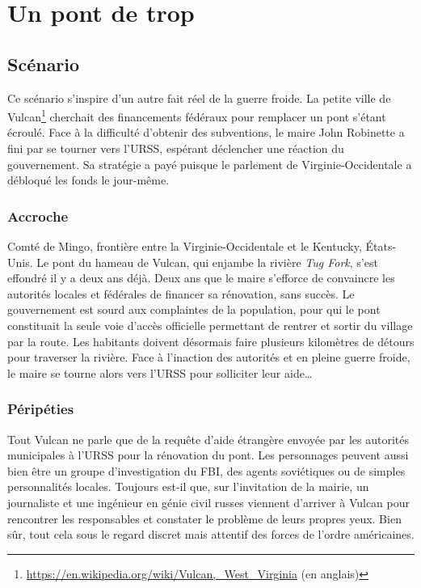 \chapter{Un pont de trop}

\section{Scénario}

Ce scénario s'inspire d'un autre fait réel de la guerre froide. La petite ville de Vulcan\footnote{\url{https://en.wikipedia.org/wiki/Vulcan,_West_Virginia} (en anglais)} cherchait des financements fédéraux pour remplacer un pont s'étant écroulé.
Face à la difficulté d'obtenir des subventions, le maire John Robinette a fini par se tourner vers l'URSS, espérant déclencher une réaction du gouvernement.
Sa stratégie a payé puisque le parlement de Virginie-Occidentale a débloqué les fonds le jour-même.

\subsection{Accroche}

Comté de Mingo, frontière entre la Virginie-Occidentale et le Kentucky, États-Unis.
Le pont du hameau de Vulcan, qui enjambe la rivière \emph{Tug Fork}, s'est effondré il y a deux ans déjà.
Deux ans que le maire s'efforce de convaincre les autorités locales et fédérales de financer sa rénovation, sans succès.
Le gouvernement est sourd aux complaintes de la population, pour qui le pont constituait la seule voie d'accès officielle permettant de rentrer et sortir du village par la route.
Les habitants doivent désormais faire plusieurs kilomètres de détours pour traverser la rivière.
Face à l'inaction des autorités et en pleine guerre froide, le maire se tourne alors vers l'URSS pour solliciter leur aide\dots

\subsection{Péripéties}

Tout Vulcan ne parle que de la requête d'aide étrangère envoyée par les autorités municipales à l'URSS pour la rénovation du pont.
Les personnages peuvent aussi bien être un groupe d'investigation du FBI, des agents soviétiques ou de simples personnalités locales. 
Toujours est-il que, sur l'invitation de la mairie, un journaliste et une ingénieur en génie civil russes viennent d'arriver à Vulcan pour rencontrer les responsables et constater le problème de leurs propres yeux.
Bien sûr, tout cela sous le regard discret mais attentif des forces de l'ordre américaines.

